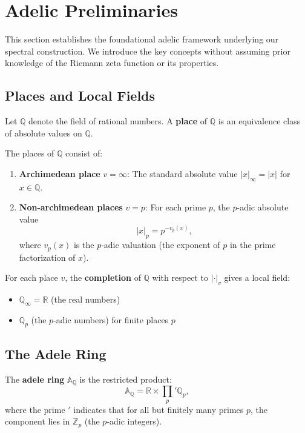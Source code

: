 \section{Adelic Preliminaries}
\label{sec:preliminaries}

This section establishes the foundational adelic framework underlying our spectral construction. We introduce the key concepts without assuming prior knowledge of the Riemann zeta function or its properties.

\subsection{Places and Local Fields}

Let $\mathbb{Q}$ denote the field of rational numbers. A \textbf{place} of $\mathbb{Q}$ is an equivalence class of absolute values on $\mathbb{Q}$.

\begin{definition}
The places of $\mathbb{Q}$ consist of:
\begin{enumerate}
\item \textbf{Archimedean place} $v = \infty$: The standard absolute value $|x|_\infty = |x|$ for $x \in \mathbb{Q}$.
\item \textbf{Non-archimedean places} $v = p$: For each prime $p$, the $p$-adic absolute value
\[
|x|_p = p^{-v_p(x)},
\]
where $v_p(x)$ is the $p$-adic valuation (the exponent of $p$ in the prime factorization of $x$).
\end{enumerate}
\end{definition}

For each place $v$, the \textbf{completion} of $\mathbb{Q}$ with respect to $|\cdot|_v$ gives a local field:
\begin{itemize}
\item $\mathbb{Q}_\infty = \mathbb{R}$ (the real numbers)
\item $\mathbb{Q}_p$ (the $p$-adic numbers) for finite places $p$
\end{itemize}

\subsection{The Adele Ring}

\begin{definition}
The \textbf{adele ring} $\mathbb{A}_\mathbb{Q}$ is the restricted product:
\[
\mathbb{A}_\mathbb{Q} = \mathbb{R} \times \prod_{p}' \mathbb{Q}_p,
\]
where the prime $'$ indicates that for all but finitely many primes $p$, the component lies in $\mathbb{Z}_p$ (the $p$-adic integers).
\end{definition}


